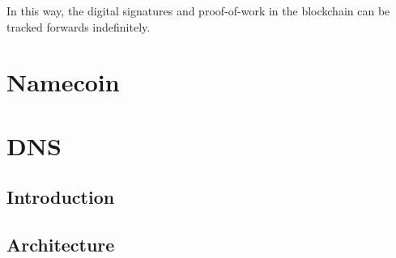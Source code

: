 In this way, the digital signatures and proof-of-work in the blockchain can be tracked forwards indefinitely. 






\section{Namecoin}




\section{DNS}

\subsection{Introduction}

\subsection{Architecture}

